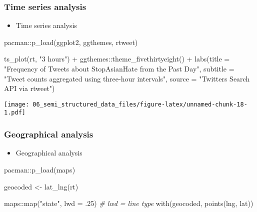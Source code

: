 \documentclass[
]{book}
\newenvironment{Shaded}{\begin{snugshade}}{\end{snugshade}}
\newcommand{\AttributeTok}[1]{\textcolor[rgb]{0.77,0.63,0.00}{#1}}
\newcommand{\CommentTok}[1]{\textcolor[rgb]{0.56,0.35,0.01}{\textit{#1}}}
\newcommand{\DecValTok}[1]{\textcolor[rgb]{0.00,0.00,0.81}{#1}}
\newcommand{\FunctionTok}[1]{\textcolor[rgb]{0.00,0.00,0.00}{#1}}
\newcommand{\NormalTok}[1]{#1}
\newcommand{\OtherTok}[1]{\textcolor[rgb]{0.56,0.35,0.01}{#1}}
\newcommand{\SpecialCharTok}[1]{\textcolor[rgb]{0.00,0.00,0.00}{#1}}
\newcommand{\StringTok}[1]{\textcolor[rgb]{0.31,0.60,0.02}{#1}}
\providecommand{\tightlist}{%
  \setlength{\itemsep}{0pt}\setlength{\parskip}{0pt}}
\begin{document}
\hypertarget{time-series-analysis}{%
\subsubsection{Time series analysis}\label{time-series-analysis}}

\begin{itemize}
\tightlist
\item
  Time series analysis
\end{itemize}

\begin{Shaded}
\begin{Highlighting}[]
\NormalTok{pacman}\SpecialCharTok{::}\FunctionTok{p\_load}\NormalTok{(ggplot2, ggthemes, rtweet)}

\FunctionTok{ts\_plot}\NormalTok{(rt, }\StringTok{"3 hours"}\NormalTok{) }\SpecialCharTok{+}
\NormalTok{  ggthemes}\SpecialCharTok{::}\FunctionTok{theme\_fivethirtyeight}\NormalTok{() }\SpecialCharTok{+}
  \FunctionTok{labs}\NormalTok{(}\AttributeTok{title =} \StringTok{"Frequency of Tweets about StopAsianHate from the Past Day"}\NormalTok{,}
       \AttributeTok{subtitle =} \StringTok{"Tweet counts aggregated using three{-}hour intervals"}\NormalTok{,}
       \AttributeTok{source =} \StringTok{"Twitter\textquotesingle{}s Search API via rtweet"}\NormalTok{)}
\end{Highlighting}
\end{Shaded}

\texttt{[image: 06\_semi\_structured\_data\_files/figure-latex/unnamed-chunk-18-1.pdf]}

\hypertarget{geographical-analysis}{%
\subsubsection{Geographical analysis}\label{geographical-analysis}}

\begin{itemize}
\tightlist
\item
  Geographical analysis
\end{itemize}

\begin{Shaded}
\begin{Highlighting}[]
\NormalTok{pacman}\SpecialCharTok{::}\FunctionTok{p\_load}\NormalTok{(maps)}

\NormalTok{geocoded }\OtherTok{\textless{}{-}} \FunctionTok{lat\_lng}\NormalTok{(rt)}

\NormalTok{maps}\SpecialCharTok{::}\FunctionTok{map}\NormalTok{(}\StringTok{"state"}\NormalTok{, }\AttributeTok{lwd =}\NormalTok{ .}\DecValTok{25}\NormalTok{) }\CommentTok{\# lwd = line type }
\FunctionTok{with}\NormalTok{(geocoded, }\FunctionTok{points}\NormalTok{(lng, lat))}
\end{Highlighting}
\end{Shaded}
\end{document}
